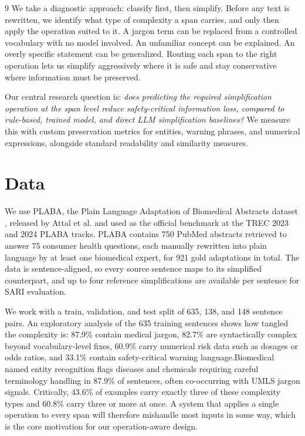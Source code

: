 \documentclass[11pt]{article}
\begin{document}
\begin{thebibliography}{9}
We take a diagnostic approach: classify first, then simplify. Before any text is
rewritten, we identify what type of complexity a span carries, and only then
apply the operation suited to it. A jargon term can be replaced from a
controlled vocabulary with no model involved. An unfamiliar concept can be
explained. An overly specific statement can be generalized. Routing each span to
the right operation lets us simplify aggressively where it is safe and stay
conservative where information must be preserved.

Our central research question is: \emph{does predicting the required
simplification operation at the span level reduce safety-critical information
loss, compared to rule-based, trained model, and direct LLM simplification
baselines?} We measure this with custom preservation metrics for entities,
warning phrases, and numerical expressions, alongside standard readability and
similarity measures.

\section{Data}

We use PLABA, the Plain Language Adaptation of Biomedical Abstracts dataset
\cite{attal2023plaba}, released by Attal et al. and used as the official
benchmark at the TREC 2023 and 2024 PLABA tracks. PLABA contains 750 PubMed
abstracts retrieved to answer 75 consumer health questions, each manually
rewritten into plain language by at least one biomedical expert, for 921 gold
adaptations in total. The data is sentence-aligned, so every source sentence
maps to its simplified counterpart, and up to four reference simplifications are
available per sentence for SARI evaluation.

We work with a train, validation, and test split of 635, 138, and 148 sentence
pairs. An exploratory analysis of the 635 training sentences shows how tangled
the complexity is: 87.9\% contain medical jargon, 82.7\% are syntactically
complex beyond vocabulary-level fixes, 60.9\% carry numerical risk data such as
dosages or odds ratios, and 33.1\% contain safety-critical warning language.Biomedical named entity recognition flags diseases and chemicals requiring careful terminology handling in 87.9\% of sentences, often co-occurring with UMLS jargon signals.
Critically, 43.6\% of examples carry exactly three of these complexity types and
60.8\% carry three or more at once. A system that applies a single operation to
every span will therefore mishandle most inputs in some way, which is the core
motivation for our operation-aware design.


\end{thebibliography}
\end{document}

